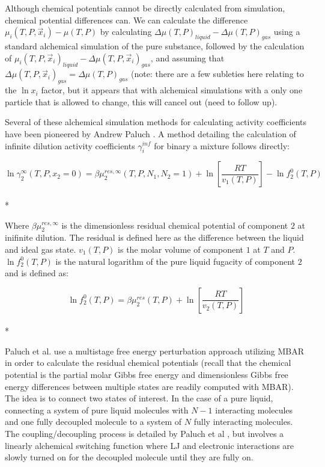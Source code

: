 \documentclass[aps,pre,twocolumn,nofootinbib,superscriptaddress,linenumbers,10pt, draft,tightenlines]{revtex4-1}
\begin{document}
Although chemical potentials cannot be directly calculated from
simulation, chemical potential differences can. We can calculate the
difference $\mu_i(T,P,\vec{x}_i) - \mu(T,P)$ by calculating $\Delta
\mu(T,P)_{liquid} - \Delta \mu(T,P)_{gas}$ using a standard alchemical
simulation of the pure substance, followed by the calculation of
$\mu_i(T,P,\vec{x}_i)_{liquid} - \Delta \mu(T,P,\vec{x}_i)_{gas}$, and
assuming that $\Delta \mu(T,P,\vec{x}_i)_{gas} = \Delta
\mu(T,P)_{gas}$ (note: there are a few subleties here relating to the
$\ln x_i$ factor, but it appears that with alchemical simulations with
a only one particle that is allowed to change, this will cancel out
(need to follow up).

Several of these alchemical simulation methods for calculating activity coefficients have been pioneered by Andrew Paluch \cite{paluch1}. A method detailing the calculation of infinite dilution activity coefficients $\gamma_i^{inf}$ for binary a mixture follows directly:

\begin{equation}\ln\gamma_2^{\infty}\left(T,P,x_2 = 0\right) = \beta \mu_2^{res,\infty}\left(T,P,N_1,N_2 = 1\right) + \ln\left[\frac{R T}{v_1\left(T,P\right)}\right] - \ln f_2^0\left(T,P\right)\end{equation}\\*

Where $\beta\mu_2^{res,\infty}$ is the dimensionless residual chemical potential of component $2$ at inifinite dilution. The residual is defined here as the difference between the liquid and ideal gas state. $v_1\left(T,P\right)$ is the molar volume of component $1$ at $T$ and $P$. $\ln f_2^0\left(T,P\right)$ is the natural logarithm of the pure liquid fugacity of component $2$ and is defined as:

\begin{equation}\ln f_2^0\left(T,P\right) = \beta\mu_2^{res}\left(T,P\right) + \ln\left[\frac{R T}{v_2\left(T,P\right)}\right]\end{equation}\\*

Paluch et al. use a multistage free energy perturbation approach utilizing MBAR in order to calculate the residual chemical potentials (recall that the chemical potential is the partial molar Gibbs free energy and dimensionless Gibbs free energy differences between multiple states are readily computed with MBAR). The idea is to connect two states of interest. In the case of a pure liquid, connecting a system of pure liquid molecules with $N - 1$ interacting molecules and one fully decoupled molecule to a system of $N$ fully interacting molecules. The coupling/decoupling process is detailed by Paluch et al \cite{paluch0}, but involves a linearly alchemical switching function where LJ and electronic interactions are slowly turned on for the decoupled molecule until they are fully on.     
\end{document}
